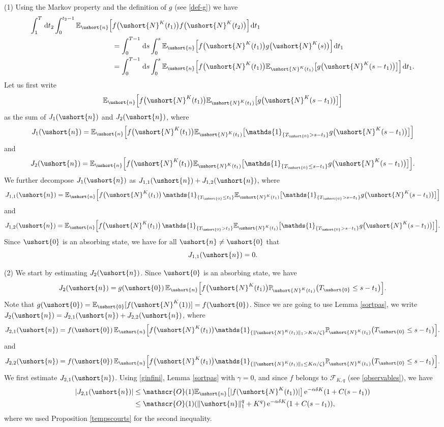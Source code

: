 \documentclass[JEP,XML,SOM,Unicode]{cedram}
\let\mathcal\mathscr
\numberwithin{equation}{section}
\theoremstyle{plain}
\theoremstyle{definition}
\newcommand{\proba}{{\mathbb{P}}}
\newcommand{\E}{{\mathbb{E}}}
\newcommand{\Oun}{\mathcal{O}(1)}
\newcommand{\sK}{K}
\newcommand{\un}{\mathds{1}}
\newcommand{\vecn}{\ushort{n}}
\newcommand{\veczer}{\ushort{0}}
\newcommand{\leproc}{\ushort{N}^{K}}
\newcommand{\sleproc}{\ushort{N}^{K}}
\newcommand{\e}{\operatorname{e}}
\newcommand{\dd}{\hspace{1pt}\mathrm{d}}
\newcommand{\norm}[1]{\|#1\|_{1}}\let\snorm\norm
\begin{document}
(1) Using the Markov property and the definition of $g$ (see \eqref{def-g}) we have
\begin{align*}
\int_{1}^{T} \dd t_{2}\int_{0}^{t_{2}-1}\E_{\vecn}\Bigl[&
f\bigl(\leproc(t_{1})\bigr) f\bigl(\leproc(t_{2})\bigr)\Bigr]\dd t_{1}\\
& =\int_{0}^{T-1} \dd s\int_{0}^{s}\E_{\vecn}\Bigl[
f\bigl(\leproc(t_{1})\bigr) g\bigl(\leproc(s)\bigr)\Bigr]\dd t_{1}\\
& = \int_{0}^{T-1} \dd s\int_{0}^{s}
\E_{\vecn}\Bigl[f\bigl(\leproc(t_{1})\bigr) \E_{\sleproc(t_{1}) } \bigl[g\bigl(\leproc(s-t_1)\bigr)\bigr]\Bigr]\dd t_{1}.
\end{align*}
Let us first write
\[
\E_{\vecn}\Bigl[f\bigl(\leproc(t_{1})\bigr) \E_{\sleproc(t_{1}) } \bigl[g\bigl(\leproc(s-t_1)\bigr)\bigr]\Bigr]
\]
as the sum of $J_{1}(\vecn)$ and $J_{2}(\vecn)$, where
\[
J_1(\vecn)=\E_{\vecn}\Bigl[f\bigl(\leproc(t_{1})\bigr)\E_{\sleproc(t_{1}) } \bigl[\un_{\{T_{\veczer} >s-t_1\}}g\bigl(\leproc(s-t_1)\bigr)\bigr]\Bigr]
\]
and
\[
J_2(\vecn)=\E_{\vecn}\Bigl[
f\bigl(\leproc(t_{1})\bigr) \E_{\sleproc(t_{1}) } \bigl[
\un_{\{T_{\veczer} \leq s-t_1\}}g\bigl(\leproc(s-t_1)\bigr)\bigr]\Bigr].
\]
We further decompose $J_1(\vecn)$ as $J_{1,1}(\vecn)+J_{1,2}(\vecn)$, where
\[
J_{1,1}(\vecn)=\E_{\vecn}\Bigl[
f\bigl(\leproc(t_{1})\bigr) \,\un_{\{T_{\veczer}\leq t_1\}}
\E_{\sleproc(t_{1}) }
\bigl[\un_{\{T_{\veczer} >s-t_1\}}g\bigl(\leproc(s-t_1)\bigr)\bigr]\Bigr]
\]
and
\[
J_{1,2}(\vecn)=\E_{\vecn}\Bigl[
f\bigl(\leproc(t_{1})\bigr)\,\un_{\{T_{\veczer}> t_1\}}
\E_{\sleproc(t_{1}) } \bigl[\un_{\{T_{\veczer} >s-t_1\}}g\bigl(\leproc(s-t_1)\bigr)\bigr]\Bigr].
\]
Since $\veczer$ is an absorbing state, we have for all $\vecn\neq \veczer$ that
\[
J_{1,1}(\vecn)=0.
\]

(2) We start by estimating $J_2(\vecn)$.
Since $\veczer$ is an absorbing state, we have
\[
J_2(\vecn)= g(\veczer)\, \E_{\vecn}\Bigl[
f\bigl(\leproc(t_{1})\bigr)\proba_{\!\sleproc(t_{1}) } \bigl(
T_{\veczer} \leq s-t_1\bigr)\Bigr].
\]
Note that $g(\veczer)= \E_{\veczer}[f(\leproc(1))]= f(\veczer)$.
Since we are going to use Lemma \ref{sortpas}, we write $J_2(\vecn)=J_{2,1}(\vecn)+J_{2,2}(\vecn)$,
where
\[
J_{2,1}(\vecn)=
f(\veczer)\,\E_{\vecn}\Bigl[
f\bigl(\leproc(t_{1})\bigr) \un_{\{\|\leproc(t_1)\|_1> K\alpha/\zeta\}} \proba_{\!\leproc(t_{1}) } \bigl(
T_{\veczer} \leq s-t_1\bigr)\Bigr].
\]
and
\[
J_{2,2}(\vecn)= f(\veczer)\,
\E_{\vecn}\Bigl[
f\bigl(\leproc(t_{1})\bigr) \un_{\{\|\leproc(t_1)\|_1\leq K\alpha/\zeta\}} \proba_{\!\leproc(t_{1}) } \bigl(
T_{\veczer} \leq s-t_1\bigr)\Bigr].
\]
We first estimate $J_{2,1}(\vecn)$.
Using \eqref{ginfini}, Lemma \ref{sortpas} with $\gamma=0$,
and since $f$ belongs to $\mathscr{F}\!_{\sK,q}$ (see \eqref{observables}), we have
\begin{align*}
|J_{2,1}(\vecn)|
& \leq \Oun \E_{\vecn}\bigl[|f(\leproc(t_1))|\bigr] \e^{- \alpha \delta K}(1+C {(s-t_1)})\\
& \leq \Oun (\norm{\vecn}^{q} + K^q) \e^{- \alpha \delta K}(1+C {(s-t_1)}),
\end{align*}
where we used Proposition \ref{tempscourts} for the second inequality.
\end{document}

